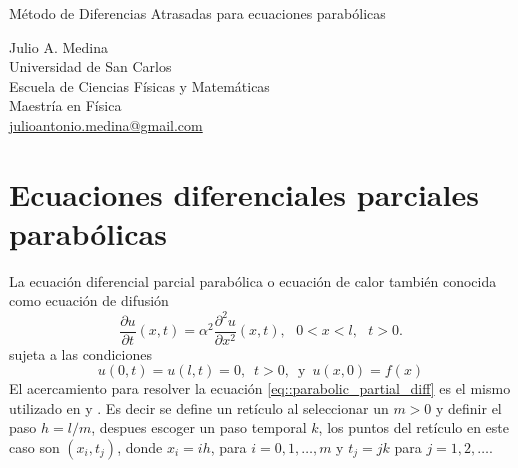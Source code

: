 \documentclass[a4paper]{article}
\begin{document}

\Large
 \begin{center}
Método de Diferencias Atrasadas para ecuaciones parabólicas\\


\hspace{10pt}

\large
Julio A. Medina\\
\hspace{10pt}
\small  
Universidad de San Carlos\\
Escuela de Ciencias Físicas y Matemáticas\\
Maestría en Física\\
\href{mailto:julioantonio.medina@gmail.com}{julioantonio.medina@gmail.com}\\

\end{center}

\hspace{10pt}

\normalsize
\section{Ecuaciones diferenciales parciales parabólicas}
La ecuación diferencial parcial parabólica o ecuación de calor también conocida como ecuación de difusión
\begin{equation}\label{eq::parabolic_partial_diff}
\frac{\partial u}{\partial t}(x,t) = \alpha^2 \frac{\partial^2 u}{\partial x^2}(x,t),\,\,\,\, 0<x<l, \,\,\,\, t>0.
\end{equation}
sujeta a las condiciones
\begin{equation}
u(0,t)=u(l,t)=0,\,\,\, t>0, \,\,\,\text{y}\,\,\, u(x,0)=f(x)
\end{equation}
El acercamiento para resolver la ecuación \ref{eq::parabolic_partial_diff} es el mismo utilizado en \cite{Medina} y \cite{Burden}. Es decir se define un retículo al seleccionar un $m>0$ y definir el paso $h=l/m$, despues escoger un paso temporal $k$, los puntos del retículo en este caso son $(x_i, t_j)$, donde $x_i=ih$, para $i=0,1,\hdots,m$ y $t_j=jk$ para $j=1,2,\hdots$. 
\end{document}
